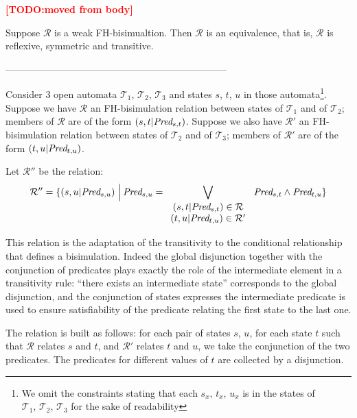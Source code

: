 \documentclass{lncs/llncs}
\newcommand{\TODO}[1]{\textcolor{red}{\textbf{[TODO:#1]}}}
\begin{document}
\TODO{moved from body}

\begin{theorem}\label{thm-weak-equiv} Suppose $\mathcal{R}$ 
is a weak FH-bisimualtion. Then $\mathcal{R}$ is an equivalence, that is, $\mathcal{R}$ is 
reflexive, symmetric and transitive.
\end{theorem}

---------------------------------------------------------------------

Consider 3 open automata 
       	$\mathcal{T}_1$, $\mathcal{T}_2$, $\mathcal{T}_3$ and states $s$, $t$, $u$ 
       	in those 
       	automata\footnote{We omit the constraints stating that each $s_x,\,t_x,\,u_x$ is 
       	in the 
       	states of 
       		$\mathcal{T}_1,\,\mathcal{T}_2,\,\mathcal{T}_3$ for the sake of readability}.
       	Suppose we have $\mathcal{R}$ an FH-bisimulation relation between states of 
       	$\mathcal{T}_1$ and of  $\mathcal{T}_2$; members of $\mathcal{R}$ are of the form 
       	$(s,t|\Pred_{s,t})$.
       	Suppose we also  have $\mathcal{R}'$ an FH-bisimulation relation between states 
       	of 
       	$\mathcal{T}_2$ and of  $\mathcal{T}_3$; members of $\mathcal{R}'$ are of the 
       	form 
       	$(t,u|\Pred_{t,u})$.
       	
       	Let $\mathcal{R}''$ be the relation: 
       	\[\mathcal{R}'' = 
       	\{(s,u|\Pred_{s,u})\,\,\Big|\,\Pred_{s,u}=\bigvee_{\begin{array}{c}       		
       		(s,t|\Pred_{s,t})\in\mathcal{R}\\ (t,u|\Pred_{t,u})\in\mathcal{R}' 	
       		\end{array}
       	}\,\Pred_{s,t}\land\Pred_{t,u}\}\]

This relation is the adaptation of the transitivity to the conditional relationship that 
defines a bisimulation. Indeed the global disjunction together with the conjunction of 
predicates plays exactly the role of the intermediate element in a transitivity rule: 
``there exists an intermediate state'' corresponds to the global disjunction, and the 
conjunction of states expresses the intermediate predicate is used to ensure 
satisfiability of the predicate relating the first state to the last one.
       	
       	The relation is built as follows: for each pair of states $s$, $u$, for each 
       	state 
       	$t$ such that $\mathcal{R}$ relates $s$ and $t$, and $\mathcal{R}'$ relates 
       	$t$ 
       	and $u$, we take the conjunction of the two predicates. The predicates for 
       	different 
       	values of $t$ are collected by a disjunction. 
       	
\end{document}
